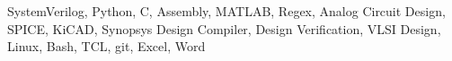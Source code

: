 

\begin{cvhonors}

  \cvhonor
    {SystemVerilog, Python, C, Assembly, MATLAB, Regex, Analog Circuit Design, SPICE, KiCAD, Synopsys Design Compiler, Design Verification, VLSI Design, Linux, Bash, TCL, git, Excel, Word} %
    {}
    {}
    {}

\end{cvhonors}
